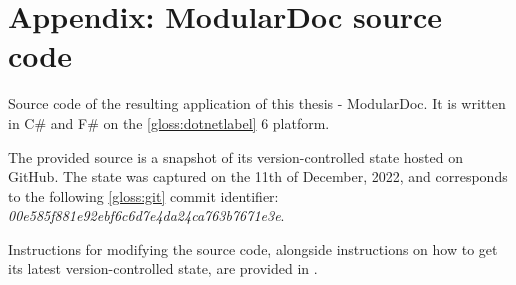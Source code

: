 \section*{Appendix: ModularDoc source code} \label{app:modularDocSourceCode}

Source code of the resulting application of this thesis - ModularDoc.
It is written in C\# and F\# on the \ref{gloss:dotnetlabel} 6 platform.

The provided source is a snapshot of its version-controlled state hosted on GitHub.
The state was captured on the 11th of December, 2022, and corresponds to the following \ref{gloss:git} commit identifier: \textit{00e585f881e92ebf6c6d7e4da24ca763b7671e3e}.

Instructions for modifying the source code, alongside instructions on how to get its latest version-controlled state, are provided in .
